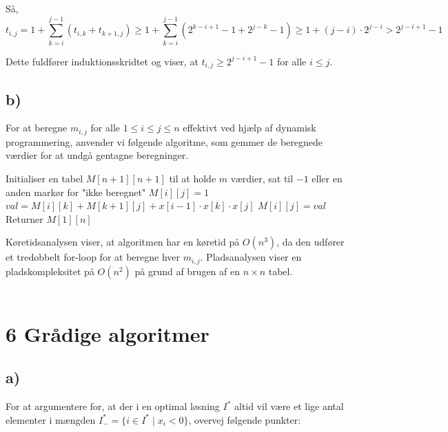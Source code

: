 \documentclass{article}
\begin{document}
Så,
\[
t_{i, j} = 1 + \sum_{k=i}^{j-1} (t_{i, k} + t_{k+1, j}) \geq 1 + \sum_{k=i}^{j-1} (2^{k-i+1}-1 + 2^{j-k}-1) \geq 1 + (j-i) \cdot 2^{j-i} > 2^{j-i+1}-1
\]

Dette fuldfører induktionsskridtet og viser, at $t_{i, j} \geq 2^{j-i+1}-1$ for alle $i \leq j$.
\\

\subsection*{b)}

For at beregne $m_{i, j}$ for alle $1 \leq i \leq j \leq n$ effektivt ved hjælp af dynamisk programmering, anvender vi følgende algoritme, som gemmer de beregnede værdier for at undgå gentagne beregninger.


\begin{algorithm}
\caption{Beregn $m_{i, j}$ ved hjælp af dynamisk programmering}
\begin{algorithmic}
\STATE Initialiser en tabel $M[n+1][n+1]$ til at holde $m$ værdier, sat til $-1$ eller en anden markør for "ikke beregnet"
            \STATE $M[i][j] = 1$
        \ELSE
                \STATE $val = M[i][k] + M[k+1][j] + x[i-1] \cdot x[k] \cdot x[j]$
                    \STATE $M[i][j] = val$
                \ENDIF
            \ENDFOR
        \ENDIF
    \ENDFOR
\ENDFOR
\STATE Returner $M[1][n]$
\end{algorithmic}
\end{algorithm}


Køretidsanalysen viser, at algoritmen har en køretid på $O(n^3)$, da den udfører et tredobbelt for-loop for at beregne hver $m_{i, j}$. Pladsanalysen viser en pladskompleksitet på $O(n^2)$ på grund af brugen af en $n \times n$ tabel.
\\
\\

\section*{6 Grådige algoritmer}

\subsection*{a)}

For at argumentere for, at der i en optimal løsning $I^*$ altid vil være et lige antal elementer i mængden $I_{-}^* = \{i \in I^* \mid x_i < 0\}$, overvej følgende punkter:
\end{document}
